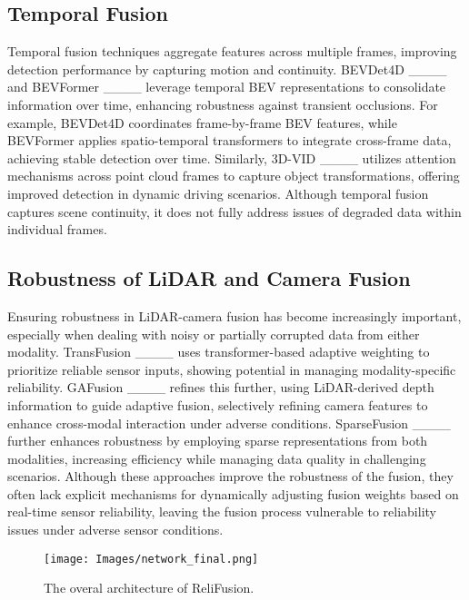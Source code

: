 \subsection{Temporal Fusion}
Temporal fusion techniques aggregate features across multiple frames, improving detection performance by capturing motion and continuity. BEVDet4D ____ and BEVFormer ____ leverage temporal BEV representations to consolidate information over time, enhancing robustness against transient occlusions. For example, BEVDet4D coordinates frame-by-frame BEV features, while BEVFormer applies spatio-temporal transformers to integrate cross-frame data, achieving stable detection over time. Similarly, 3D-VID ____ utilizes attention mechanisms across point cloud frames to capture object transformations, offering improved detection in dynamic driving scenarios. Although temporal fusion captures scene continuity, it does not fully address issues of degraded data within individual frames.



\subsection{Robustness of LiDAR and Camera Fusion}
Ensuring robustness in LiDAR-camera fusion has become increasingly important, especially when dealing with noisy or partially corrupted data from either modality. TransFusion ____ uses transformer-based adaptive weighting to prioritize reliable sensor inputs, showing potential in managing modality-specific reliability. GAFusion ____ refines this further, using LiDAR-derived depth information to guide adaptive fusion, selectively refining camera features to enhance cross-modal interaction under adverse conditions. SparseFusion ____ further enhances robustness by employing sparse representations from both modalities, increasing efficiency while managing data quality in challenging scenarios. Although these approaches improve the robustness of the fusion, they often lack explicit mechanisms for dynamically adjusting fusion weights based on real-time sensor reliability, leaving the fusion process vulnerable to reliability issues under adverse sensor conditions.

\begin{figure*}[tb]
    \centering
  \texttt{[image: Images/network\_final.png]}
  \caption{The overal architecture of ReliFusion.}
  
  \label{fig:Network_Reli}
\end{figure*}



